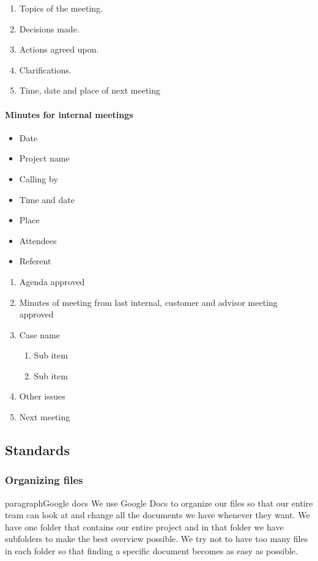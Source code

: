 \begin{enumerate}
\item{}Topics of the meeting.
\item{}Decisions made.
\item{}Actions agreed upon.
\item{}Clarifications.
\item{}Time, date and place of next meeting
\end{enumerate}

\paragraph{Minutes for internal meetings} \hfill
\begin{itemize}
\item{}Date
\item{}Project name
\item{}Calling by
\item{}Time and date 
\item{}Place 
\item{}Attendees 
\item{}Referent
\end{itemize}

\begin{enumerate}
\item{}Agenda approved
\item{}Minutes of meeting from last internal, customer and advisor meeting approved
\item{}Case name
\begin{enumerate}
\item{}Sub item
\item{}Sub item
\end{enumerate}
\item{}Other issues
\item{}Next meeting
\end{enumerate}

\subsection{Standards}

\subsubsection{Organizing files}
paragraph{Google docs}\hfill
 We use Google Docs to organize our files so that our entire team can look at and change all the documents we have whenever they want. We have one folder that contains our entire project and in that folder we have subfolders to make the best overview possible. We try not to have too many files in each folder so that finding a specific document becomes as easy as possible.

